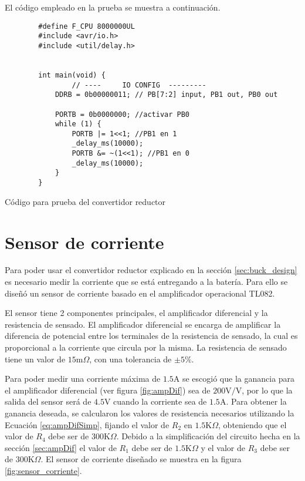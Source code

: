 El código empleado en la prueba se muestra a continuación.

\begin{table}[H]
    \begin{lstlisting}
        #define F_CPU 8000000UL
        #include <avr/io.h>
        #include <util/delay.h>


        int main(void) {
                // ----     IO CONFIG  ---------
            DDRB = 0b00000011; // PB[7:2] input, PB1 out, PB0 out
            
            PORTB = 0b0000000; //activar PB0
            while (1) {
                PORTB |= 1<<1; //PB1 en 1
                _delay_ms(10000);
                PORTB &= ~(1<<1); //PB1 en 0
                _delay_ms(10000);
            }
        }

    \end{lstlisting}
    \caption{Código para prueba del convertidor reductor}
\end{table}

\section{Sensor de corriente}

    Para poder usar el convertidor reductor explicado en la sección
    \ref{sec:buck_design} es necesario medir la corriente que se
    está entregando a la batería. Para ello se diseñó un sensor de corriente
    basado en el amplificador operacional TL082.

    El sensor tiene 2 componentes principales, el amplificador diferencial y 
    la resistencia de sensado. El amplificador diferencial se encarga de 
    amplificar la diferencia de potencial entre los terminales de la resistencia
    de sensado, la cual es proporcional a la corriente que circula por la misma.
    La resistencia de sensado tiene un valor de $15 \text{m}\Omega$, con una
     tolerancia de $\pm 5\%$.

    Para poder medir una corriente máxima de $1.5\text{A}$ se escogió que 
    la ganancia para el amplificador diferencial (ver figura \ref{fig:ampDif})
    sea de $200\text{V/V}$, por lo que la salida del sensor será de
    $4.5\text{V}$ cuando la corriente sea de $1.5\text{A}$. Para obtener
    la ganancia deseada, se calcularon los valores de resistencia 
    necesarios utilizando la Ecuación \ref{eq:ampDifSimp}, fijando 
    el valor de $R_2$ en
    $1.5\text{K}\Omega$, obteniendo que el valor de $R_4$ debe ser de 
    $300\text{K}\Omega$. Debido a la  simplificación del circuito hecha en la 
    sección \ref{sec:ampDif} el valor de $R_1$ debe ser de $1.5\text{K}\Omega$
    y el valor de $R_3$ debe ser de $300\text{K}\Omega$. El sensor de corriente 
    diseñado se muestra en la figura \ref{fig:sensor_corriente}.

